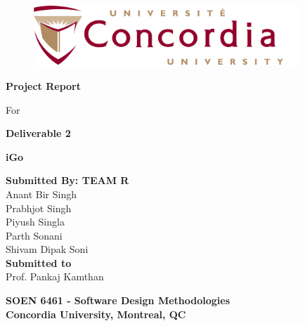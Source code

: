 \documentclass[a4paper,12pt]{article}
\begin{document}
\begin{titlepage}

\begin{center}
\vspace*{-1.2in}
\begin{figure}[htb]
\begin{center}
\includegraphics[width=10cm]{Concordia_logo.png}
\end{center}
\end{figure}
\begin{Large}
\vspace*{0.3in}
\textbf{Project Report} \\
\end{Large}
\vspace*{0.1in}
\begin{Large}
For\\
\end{Large}
\vspace*{0.1in}

\begin{Large}
\textbf{Deliverable 2} \\
\end{Large}
\vspace*{0.1in}

\begin{Large}
\textbf{iGo} \\
\end{Large}
\vspace*{0.3in}

\begin{large}
\textbf{Submitted By: TEAM R} \\[1.0 cm]
\vspace*{0.1in}
Anant Bir Singh\\
Prabhjot Singh\\
Piyush Singla\\
Parth Sonani\\
Shivam Dipak Soni\\
\vspace*{0.2in}
\textbf{Submitted to}\\
\vspace*{0.1in}
Prof. Pankaj Kamthan\\
\vspace*{0.3in}

\begin{Large}
\textbf{SOEN 6461 - Software Design Methodologies} \\
\vspace*{0.2in}
\textbf{Concordia University, Montreal, QC}
\end{Large}

\end{large}
\end{center}
\end{titlepage}
\end{document}
